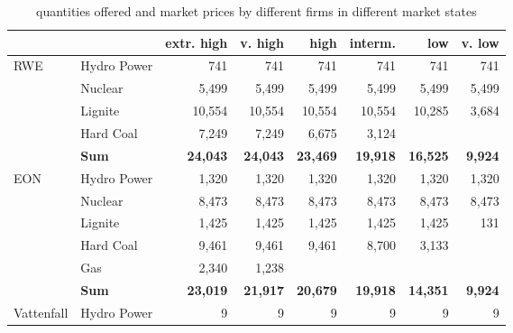 
\begin{table}[htb]
\centering
\caption{quantities offered and market prices by different firms in different market states}
\begin{tabular}{llrrrrrr}
\hline
\hline
           &            & extr. high &    v. high &       high &    interm. &        low &     v. low \\
\hline
       RWE & Hydro Power &        741 &        741 &        741 &        741 &        741 &        741 \\

           &    Nuclear &       5,499 &       5,499 &       5,499 &       5,499 &       5,499 &       5,499 \\

           &    Lignite &      10,554 &      10,554 &      10,554 &      10,554 &      10,285 &       3,684 \\

           &  Hard Coal &       7,249 &       7,249 &       6,675 &       3,124 &            &            \\

           &  {\bf Sum} & {\bf 24,043} & {\bf 24,043} & {\bf 23,469} & {\bf 19,918} & {\bf 16,525} & {\bf 9,924} \\
\hline
       EON & Hydro Power &       1,320 &       1,320 &       1,320 &       1,320 &       1,320 &       1,320 \\

           &    Nuclear &       8,473 &       8,473 &       8,473 &       8,473 &       8,473 &       8,473 \\

           &    Lignite &       1,425 &       1,425 &       1,425 &       1,425 &       1,425 &        131 \\

           &  Hard Coal &       9,461 &       9,461 &       9,461 &       8,700 &       3,133 &            \\

           &        Gas &       2,340 &       1,238 &            &            &            &            \\

           &  {\bf Sum} & {\bf 23,019} & {\bf 21,917} & {\bf 20,679} & {\bf 19,918} & {\bf 14,351} & {\bf 9,924} \\
\hline
Vattenfall & Hydro Power &          9 &          9 &          9 &          9 &          9 &          9 \\


\end{tabular}
\end{table}
